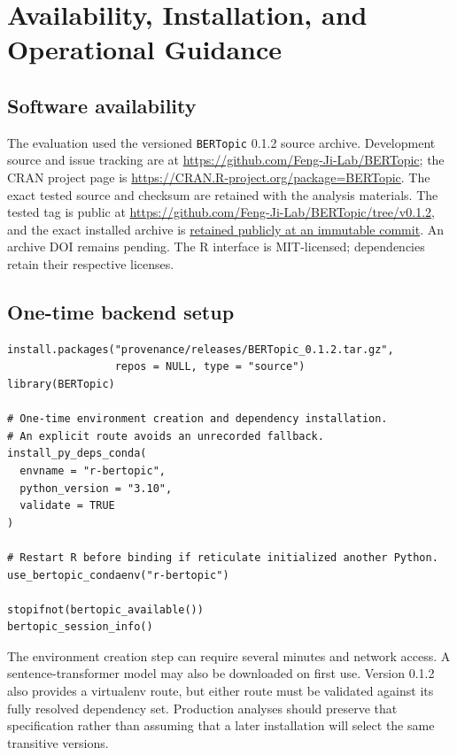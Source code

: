 \documentclass[12pt]{article}
\newcommand{\pkg}[1]{\texttt{#1}}
\begin{document}
\section{Availability, Installation, and Operational Guidance}

\subsection{Software availability}

The evaluation used the versioned \pkg{BERTopic} 0.1.2 source archive. Development source and issue tracking are at \url{https://github.com/Feng-Ji-Lab/BERTopic}; the CRAN project page is \url{https://CRAN.R-project.org/package=BERTopic}. The exact tested source and checksum are retained with the analysis materials. The tested tag is public at \url{https://github.com/Feng-Ji-Lab/BERTopic/tree/v0.1.2}, and the exact installed archive is \href{https://github.com/Feng-Ji-Lab/BERTopic/raw/64907e737025fe456d3673afcf0f467df4deb20d/provenance/releases/BERTopic_0.1.2.tar.gz}{retained publicly at an immutable commit}. An archive DOI remains pending. The R interface is MIT-licensed; dependencies retain their respective licenses.

\subsection{One-time backend setup}

\begin{lstlisting}[caption={Installing and binding the Python backend.}]
install.packages("provenance/releases/BERTopic_0.1.2.tar.gz",
                 repos = NULL, type = "source")
library(BERTopic)

# One-time environment creation and dependency installation.
# An explicit route avoids an unrecorded fallback.
install_py_deps_conda(
  envname = "r-bertopic",
  python_version = "3.10",
  validate = TRUE
)

# Restart R before binding if reticulate initialized another Python.
use_bertopic_condaenv("r-bertopic")

stopifnot(bertopic_available())
bertopic_session_info()
\end{lstlisting}

The environment creation step can require several minutes and network access. A sentence-transformer model may also be downloaded on first use. Version 0.1.2 also provides a virtualenv route, but either route must be validated against its fully resolved dependency set. Production analyses should preserve that specification rather than assuming that a later installation will select the same transitive versions.
\end{document}
